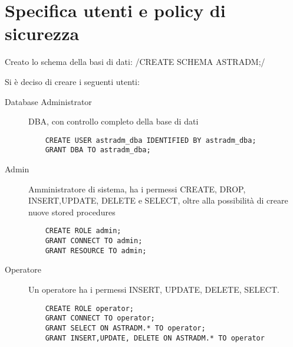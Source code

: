 \section{Specifica utenti e policy di sicurezza}
Creato lo schema della basi di dati:
/CREATE SCHEMA ASTRADM;/
\par
Si è deciso di creare i seguenti utenti:
\begin{description}
\item[Database Administrator] DBA, con controllo completo della base di dati
  \begin{verbatim}
    CREATE USER astradm_dba IDENTIFIED BY astradm_dba;
    GRANT DBA TO astradm_dba;
  \end{verbatim}
\item[Admin] Amministratore di sistema, ha i permessi CREATE, DROP, INSERT,UPDATE, DELETE e SELECT, oltre alla
  possibilità di creare nuove stored procedures
  \begin{verbatim}
    CREATE ROLE admin;
    GRANT CONNECT TO admin;
    GRANT RESOURCE TO admin;
  \end{verbatim}
\item[Operatore] Un operatore ha i permessi INSERT, UPDATE, DELETE, SELECT.
  \begin{verbatim}
    CREATE ROLE operator;
    GRANT CONNECT TO operator;
    GRANT SELECT ON ASTRADM.* TO operator;
    GRANT INSERT,UPDATE, DELETE ON ASTRADM.* TO operator
  \end{verbatim}
\end{description}

